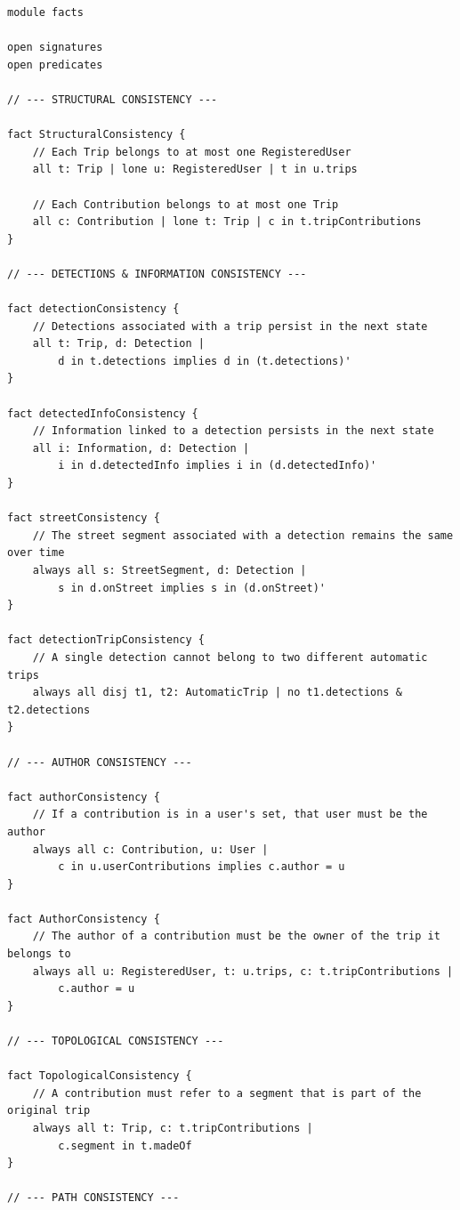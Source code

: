 \begin{lstlisting}[language=alloy, caption={Alloy Facts for BBP}, label={lst:facts}]
module facts

open signatures
open predicates

// --- STRUCTURAL CONSISTENCY ---

fact StructuralConsistency {
    // Each Trip belongs to at most one RegisteredUser
    all t: Trip | lone u: RegisteredUser | t in u.trips

    // Each Contribution belongs to at most one Trip
    all c: Contribution | lone t: Trip | c in t.tripContributions
}

// --- DETECTIONS & INFORMATION CONSISTENCY ---

fact detectionConsistency {
    // Detections associated with a trip persist in the next state
    all t: Trip, d: Detection |
        d in t.detections implies d in (t.detections)'
}

fact detectedInfoConsistency {
    // Information linked to a detection persists in the next state
    all i: Information, d: Detection |
        i in d.detectedInfo implies i in (d.detectedInfo)'
}

fact streetConsistency {
    // The street segment associated with a detection remains the same over time
    always all s: StreetSegment, d: Detection |
        s in d.onStreet implies s in (d.onStreet)'
}

fact detectionTripConsistency {
    // A single detection cannot belong to two different automatic trips
    always all disj t1, t2: AutomaticTrip | no t1.detections & t2.detections
}

// --- AUTHOR CONSISTENCY ---

fact authorConsistency {
    // If a contribution is in a user's set, that user must be the author
    always all c: Contribution, u: User |
        c in u.userContributions implies c.author = u
}

fact AuthorConsistency {
    // The author of a contribution must be the owner of the trip it belongs to
    always all u: RegisteredUser, t: u.trips, c: t.tripContributions |
        c.author = u
}

// --- TOPOLOGICAL CONSISTENCY ---

fact TopologicalConsistency {
    // A contribution must refer to a segment that is part of the original trip
    always all t: Trip, c: t.tripContributions |
        c.segment in t.madeOf
}

// --- PATH CONSISTENCY ---


\end{lstlisting}
